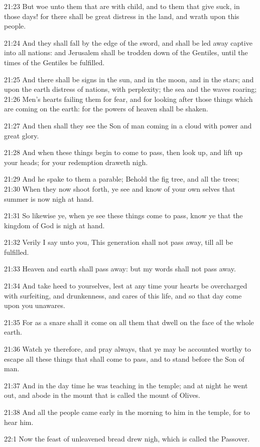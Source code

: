 21:23 But woe unto them that are with child, and to them that give suck, in those days! for there shall be great distress in the land, and wrath upon this people.

21:24 And they shall fall by the edge of the sword, and shall be led away captive into all nations: and Jerusalem shall be trodden down of the Gentiles, until the times of the Gentiles be fulfilled.

21:25 And there shall be signs in the sun, and in the moon, and in the stars; and upon the earth distress of nations, with perplexity; the sea and the waves roaring; 21:26 Men's hearts failing them for fear, and for looking after those things which are coming on the earth: for the powers of heaven shall be shaken.

21:27 And then shall they see the Son of man coming in a cloud with power and great glory.

21:28 And when these things begin to come to pass, then look up, and lift up your heads; for your redemption draweth nigh.

21:29 And he spake to them a parable; Behold the fig tree, and all the trees; 21:30 When they now shoot forth, ye see and know of your own selves that summer is now nigh at hand.

21:31 So likewise ye, when ye see these things come to pass, know ye that the kingdom of God is nigh at hand.

21:32 Verily I say unto you, This generation shall not pass away, till all be fulfilled.

21:33 Heaven and earth shall pass away: but my words shall not pass away.

21:34 And take heed to yourselves, lest at any time your hearts be overcharged with surfeiting, and drunkenness, and cares of this life, and so that day come upon you unawares.

21:35 For as a snare shall it come on all them that dwell on the face of the whole earth.

21:36 Watch ye therefore, and pray always, that ye may be accounted worthy to escape all these things that shall come to pass, and to stand before the Son of man.

21:37 And in the day time he was teaching in the temple; and at night he went out, and abode in the mount that is called the mount of Olives.

21:38 And all the people came early in the morning to him in the temple, for to hear him.

22:1 Now the feast of unleavened bread drew nigh, which is called the Passover.

